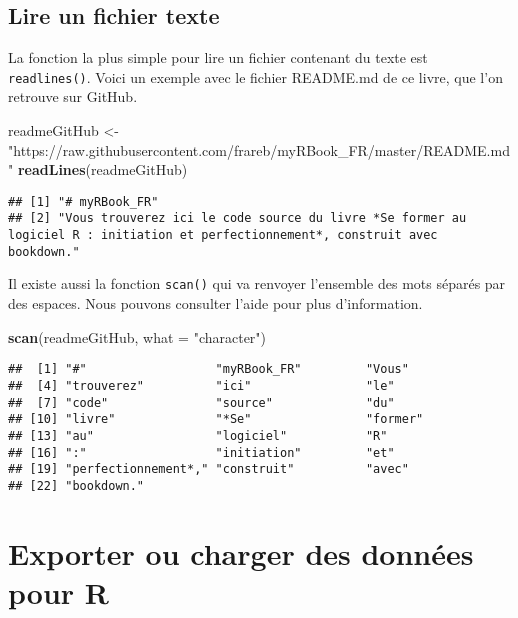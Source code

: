 \documentclass[]{book}
\newenvironment{Shaded}{\begin{snugshade}}{\end{snugshade}}
\newcommand{\KeywordTok}[1]{\textcolor[rgb]{0.13,0.29,0.53}{\textbf{#1}}}
\newcommand{\DataTypeTok}[1]{\textcolor[rgb]{0.13,0.29,0.53}{#1}}
\newcommand{\StringTok}[1]{\textcolor[rgb]{0.31,0.60,0.02}{#1}}
\newcommand{\NormalTok}[1]{#1}
\theoremstyle{definition}
\theoremstyle{definition}
\theoremstyle{definition}
\theoremstyle{remark}
\begin{document}
\subsection{Lire un fichier texte}\label{l016readTXT}

La fonction la plus simple pour lire un fichier contenant du texte est
\texttt{readlines()}. Voici un exemple avec le fichier README.md de ce
livre, que l'on retrouve sur GitHub.

\begin{Shaded}
\begin{Highlighting}[]
\NormalTok{readmeGitHub <-}\StringTok{ "https://raw.githubusercontent.com/frareb/myRBook_FR/master/README.md"}
\KeywordTok{readLines}\NormalTok{(readmeGitHub)}
\end{Highlighting}
\end{Shaded}

\begin{verbatim}
## [1] "# myRBook_FR"                                                                                                                   
## [2] "Vous trouverez ici le code source du livre *Se former au logiciel R : initiation et perfectionnement*, construit avec bookdown."
\end{verbatim}

Il existe aussi la fonction \texttt{scan()} qui va renvoyer l'ensemble
des mots séparés par des espaces. Nous pouvons consulter l'aide pour
plus d'information.

\begin{Shaded}
\begin{Highlighting}[]
\KeywordTok{scan}\NormalTok{(readmeGitHub, }\DataTypeTok{what =} \StringTok{"character"}\NormalTok{)}
\end{Highlighting}
\end{Shaded}

\begin{verbatim}
##  [1] "#"                  "myRBook_FR"         "Vous"              
##  [4] "trouverez"          "ici"                "le"                
##  [7] "code"               "source"             "du"                
## [10] "livre"              "*Se"                "former"            
## [13] "au"                 "logiciel"           "R"                 
## [16] ":"                  "initiation"         "et"                
## [19] "perfectionnement*," "construit"          "avec"              
## [22] "bookdown."
\end{verbatim}

\section{Exporter ou charger des données pour R}\label{l016save}
\end{document}
